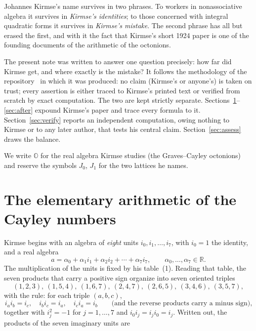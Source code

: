 \documentclass[11pt]{amsart}
\newcommand{\OO}{\mathbb{O}}
\newcommand{\RR}{\mathbb{R}}
\numberwithin{equation}{section}
\theoremstyle{definition}
\theoremstyle{plain}
\theoremstyle{remark}
\begin{document}
Johannes Kirmse's name survives in two phrases.  To workers in
nonassociative algebra it survives in \emph{Kirmse's identities}; to those
concerned with integral quadratic forms it survives in \emph{Kirmse's
mistake}.  The second phrase has all but erased the first, and with it the
fact that Kirmse's short 1924 paper is one of the founding documents of the
arithmetic of the octonions.

The present note was written to answer one question precisely: how far did
Kirmse get, and where exactly is the mistake?  It follows the methodology of
the repository~\cite{repo} in which it was produced: no claim (Kirmse's
or anyone's) is taken on trust; every assertion is either traced to
Kirmse's printed text or verified from scratch by exact computation.  The
two are kept strictly separate.  Sections~\ref{sec:arith}--\ref{sec:after}
expound Kirmse's paper and trace every formula to it.  Section~\ref{sec:verify}
reports an independent computation, owing nothing to Kirmse or to any later
author, that tests his central claim.  Section~\ref{sec:assess} draws the
balance.

We write $\OO$ for the real algebra Kirmse studies (the Graves--Cayley
octonions) and reserve the symbols $J_0$, $J_1$ for the two lattices he
names.

\section{The elementary arithmetic of the Cayley numbers}\label{sec:arith}

Kirmse begins with an algebra of \emph{eight} units
$i_0, i_1, \ldots, i_7$, with $i_0 = 1$ the identity, and a real algebra
\[
  a = \alpha_0 + \alpha_1 i_1 + \alpha_2 i_2 + \cdots + \alpha_7 i_7,
  \qquad \alpha_0,\ldots,\alpha_7 \in \RR .
\]
The multiplication of the units is fixed by his table~(1).  Reading that
table, the seven products that carry a positive sign organize into seven
oriented triples
\begin{equation}\label{eq:triples}
  (1,2,3),\ (1,5,4),\ (1,6,7),\ (2,4,7),\ (2,6,5),\ (3,4,6),\ (3,5,7),
\end{equation}
with the rule: for each triple $(a,b,c)$,
\[
  i_a i_b = i_c,\quad i_b i_c = i_a,\quad i_c i_a = i_b
  \qquad\text{(and the reverse products carry a minus sign),}
\]
together with $i_j^2 = -1$ for $j=1,\ldots,7$ and $i_0 i_j = i_j i_0 = i_j$.
Written out, the products of the seven imaginary units are
\end{document}

